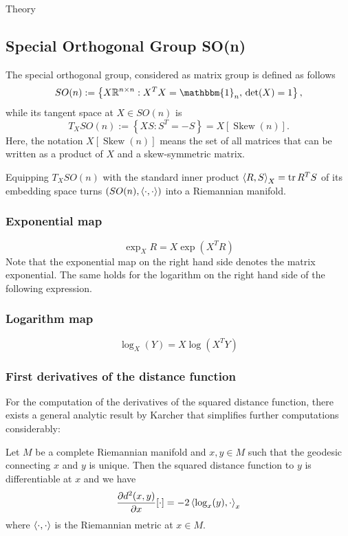 \begin{chapter}{Theory}
\subsection{Special Orthogonal Group SO(n)} %
\label{sub:SO(N)}
The special orthogonal group, considered as matrix group is defined as follows
\begin{equation}
    SO(n):=\left\lbrace X\mathbb{R}^{n\times n}: X^TX=\mathbbm{1}_n,\,\det(X)=1\right\rbrace,
\end{equation}
while its tangent space at $X\in SO(n)$ is
\begin{equation}
    \label{eq:son_tangent_space}
    T_XSO(n):=\left\lbrace XS: S^T=-S \right\rbrace = X[\operatorname{Skew}(n)].
\end{equation}
Here, the notation $X[\operatorname{Skew}(n)]$ means the set of all matrices that can be written
as a product of $X$ and a skew-symmetric matrix.

Equipping $T_XSO(n)$ with the standard inner product $\left\langle R,S \right\rangle_X=\operatorname{tr} R^TS$ of its embedding space turns
$(SO(n),\left\langle \cdot,\cdot \right\rangle)$ into a Riemannian manifold.

\subsubsection{Exponential map} %
\label{ssub:ExponentialSO}
\begin{equation}
    \exp_X{R}=X\exp(X^TR)
\end{equation}
Note that the exponential map on the right hand side denotes the matrix exponential. The same holds for the logarithm on the right hand side of the following expression.

\subsubsection{Logarithm map} %
\label{ssub:LogarithmSO}
\begin{equation}
    \label{eq:son_log}
    \log_X(Y)=X\log(X^TY)
\end{equation}


\subsubsection{First derivatives of the distance function} %
\label{ssub:FirstDerSO}
For the computation of the derivatives of the squared distance function, there exists a general analytic result by Karcher\cite{Karcher} that simplifies further
computations considerably:
\begin{theorem}[Karcher]
\label{thm:karcher_theorem}
Let $M$ be a complete Riemannian manifold and $x,y\in M$ such that the geodesic connecting $x$ and $y$ is unique. Then the squared distance function to $y$
is differentiable at $x$ and we have
\begin{equation}
    \frac{\partial d^2(x,y)}{\partial x}[\cdot] = -2\left\langle \log_x(y),\cdot \right\rangle_{x}
\end{equation}
where $\left\langle \cdot,\cdot \right\rangle$ is the Riemannian metric at $x\in M$.
\end{theorem}


\end{chapter}
